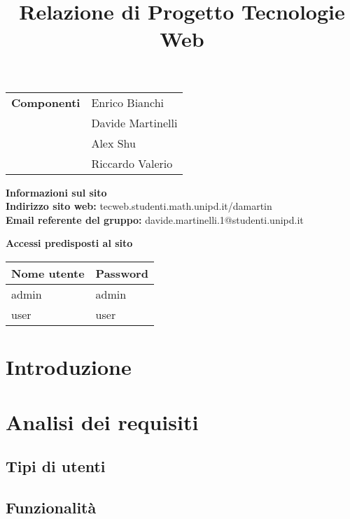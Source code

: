 \documentclass{article}
\title{Relazione di Progetto Tecnologie Web}
\date{}
\newcommand{\componenti}{
    & Enrico Bianchi \\
    & Davide Martinelli \\
    & Alex Shu \\
    & Riccardo Valerio \\
}
\begin{document}
\maketitle

\begin{center}
\begin{tabular}{r|l}
    \textbf{Componenti} \componenti 
\end{tabular}

\vspace{1cm}
\textbf{Informazioni sul sito} \\
\textbf{Indirizzo sito web:} tecweb.studenti.math.unipd.it/damartin \\
\textbf{Email referente del gruppo: }davide.martinelli.1@studenti.unipd.it

\vspace{1cm}
\textbf{Accessi predisposti al sito}
\begin{table}[h]
    \centering
    \begin{tabular}{|p{5cm}|p{5cm}|}
        \hline
        Nome utente & Password \\
        \hline
        admin & admin   \\
        user & user   \\
        \hline
    \end{tabular}
\end{table}

\end{center}

\newpage
\tableofcontents        %
\newpage

\section{Introduzione}


\newpage

\section{Analisi dei requisiti}


\subsection{Tipi di utenti}


\subsection{Funzionalità}
\end{document}
